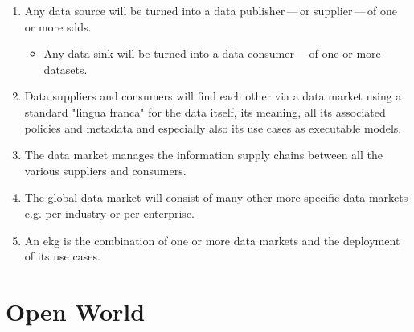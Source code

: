 \begin{enumerate}
    \item Any data source will be turned into a data publisher\,---\,or supplier\,---\,of one or more \glspl{sdd}.
          \begin{itemize}
              \item Any data sink will be turned into a data consumer\,---\,of one or more datasets.
          \end{itemize}
    \item Data suppliers and consumers will find each other via a data market using a standard "lingua franca" for the
          data itself, its meaning, all its associated policies and metadata and especially also its use cases as
          executable models.
    \item The data market manages the information supply chains between all the various suppliers and consumers.
    \item The global data market will consist of many other more specific data markets
          e.g. per industry or per enterprise.
    \item An \gls{ekg} is the combination of one or more data markets and the deployment of its use cases.
\end{enumerate}

\section{Open World}

